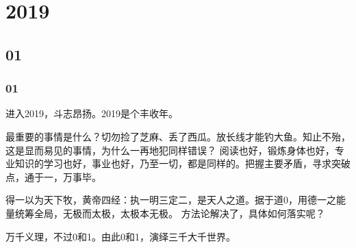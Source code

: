 \chapter{2019}

\section{01}

\subsection{01}

进入2019，斗志昂扬。2019是个丰收年。

最重要的事情是什么？切勿捡了芝麻、丢了西瓜。放长线才能钓大鱼。知止不殆，这是显而易见的事情，为什么一再地犯同样错误？
阅读也好，锻炼身体也好，专业知识的学习也好，事业也好，乃至一切，都是同样的。把握主要矛盾，寻求突破点，通于一，万事毕。

得一以为天下牧，黄帝四经：执一明三定二，是天人之道。据于道0，用德一之能量统筹全局，无极而太极，太极本无极。
方法论解决了，具体如何落实呢？

万千义理，不过0和1。由此0和1，演绎三千大千世界。
